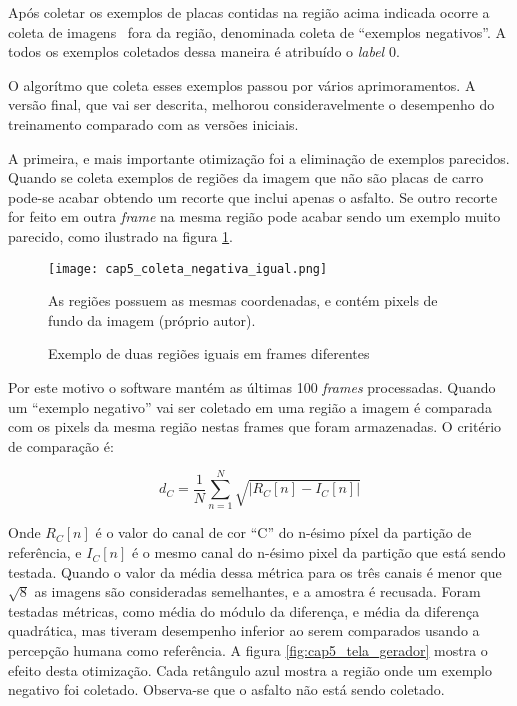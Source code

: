 Após coletar os exemplos de placas contidas na região acima indicada ocorre a
coleta de imagens  fora da região, denominada coleta de “exemplos negativos”. A
todos os exemplos coletados dessa maneira é atribuído o \emph{label} 0.

O algorítmo que coleta esses exemplos passou por vários aprimoramentos. A
versão final, que vai ser descrita, melhorou consideravelmente o desempenho do
treinamento comparado com as versões iniciais.

A primeira, e mais importante otimização foi a eliminação de exemplos
parecidos. Quando se coleta exemplos de regiões da imagem que não são placas de
carro pode-se acabar obtendo um recorte que inclui apenas o asfalto. Se outro
recorte for feito em outra \emph{frame} na mesma região pode acabar sendo
um exemplo muito parecido, como ilustrado na figura
\ref{fig:cap5_coleta_negativa_igual}.

\begin{figure}[!htb]
	\centering
	\texttt{[image: cap5\_coleta\_negativa\_igual.png]}
	\caption{Exemplo de duas regiões iguais em frames diferentes}
	\label{fig:cap5_coleta_negativa_igual}
	As regiões possuem as mesmas coordenadas, e contém pixels de fundo da
	imagem (próprio autor).
\end{figure}

Por este motivo o software mantém as últimas 100 \emph{frames} processadas.
Quando um “exemplo negativo” vai ser coletado em uma região a imagem é
comparada com os
pixels da mesma região nestas frames que foram armazenadas. O critério de
comparação é:

\begin{equation}
	d_C=\frac{1}{N} \sum_{n=1}^N \sqrt{\left| R_C [n] -I_C [n] \right|}
\end{equation}

Onde $R_C[n]$ é o valor do canal de cor “C” do n-ésimo píxel da partição de
referência, e $I_C[n]$ é o mesmo canal do n-ésimo pixel da
partição que está sendo testada. Quando o valor da média dessa métrica
para os três canais é menor que $\sqrt{8}$ as imagens são consideradas
semelhantes, e a amostra é recusada. Foram
testadas métricas, como média do módulo da diferença, e média da diferença
quadrática, mas tiveram desempenho inferior ao serem comparados usando a
percepção humana como referência. A figura
\ref{fig:cap5_tela_gerador} mostra o efeito desta otimização.
Cada retângulo azul mostra a região onde um exemplo negativo foi coletado.
Observa-se que o asfalto não está sendo coletado.

